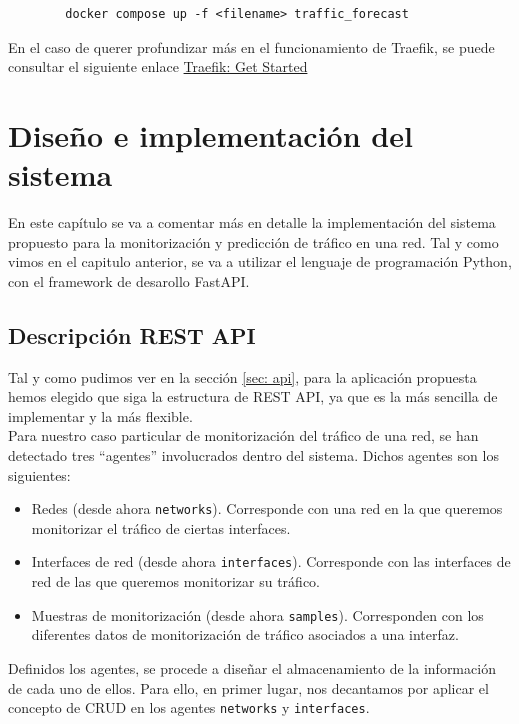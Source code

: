 \documentclass[a4paper, oneside, 12pt]{book}
\begin{document}
	\begin{verbatim}
		docker compose up -f <filename> traffic_forecast
	\end{verbatim}

	\noindent En el caso de querer profundizar más en el funcionamiento de Traefik, se puede consultar el siguiente enlace \href{https://doc.traefik.io/traefik/}{Traefik: Get Started}
	
	\chapter{Diseño e implementación del sistema}
	
	\noindent En este capítulo se va a comentar más en detalle la implementación del sistema propuesto para la monitorización y predicción de tráfico en una red. Tal y como vimos en el capitulo anterior, se va a utilizar el lenguaje de programación Python, con el framework de desarollo FastAPI.
	
	\section{Descripción REST API}
	
	\noindent Tal y como pudimos ver en la sección \ref{sec: api}, para la aplicación propuesta hemos elegido que siga la estructura de REST API, ya que es la más sencilla de implementar y la más flexible. \\
	
	\noindent Para nuestro caso particular de monitorización del tráfico de una red, se han detectado tres ``agentes'' involucrados dentro del sistema. Dichos agentes son los siguientes:
	
	\begin{itemize}
		\item Redes (desde ahora \texttt{networks}). Corresponde con una red en la que queremos monitorizar el tráfico de ciertas interfaces.
		\item Interfaces de red (desde ahora \texttt{interfaces}). Corresponde con las interfaces de red de las que queremos monitorizar su tráfico.
		\item Muestras de monitorización (desde ahora \texttt{samples}). Corresponden con los diferentes datos de monitorización de tráfico asociados a una interfaz.
	\end{itemize}

	\noindent Definidos los agentes, se procede a diseñar el almacenamiento de la información de cada uno de ellos. Para ello, en primer lugar, nos decantamos por aplicar el concepto de CRUD en los agentes \texttt{networks} y \texttt{interfaces}. \\
	
\end{document}
